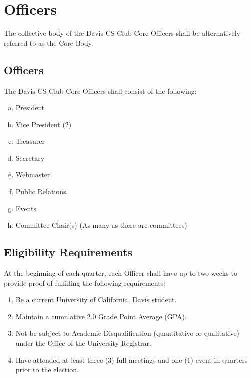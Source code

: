 \documentclass{article}
\newenvironment{li}{
\begin{enumerate}
  \setlength{\itemsep}{1pt}
  \setlength{\parskip}{0pt}
  \setlength{\parsep}{0pt}
}{\end{enumerate}}
\begin{document}
\section{Officers}
The collective body of the Davis CS Club Core Officers shall be alternatively referred to as the Core Body.

\subsection{Officers}
The Davis CS Club Core Officers shall consist of the following:
\begin{enumerate}[a.]
  \setlength{\itemsep}{1pt}
  \setlength{\parskip}{0pt}
  \setlength{\parsep}{0pt}
\item President
\item Vice President (2)
\item Treasurer
\item Secretary
\item Webmaster
\item Public Relations
\item Events
\item Committee Chair(s) (As many as there are committees)
\end{enumerate}

\subsection{Eligibility Requirements}
At the beginning of each quarter, each Officer shall have up to two weeks to provide proof of fulfilling the following requirements:
\begin{li}
\item Be a current University of California, Davis student.
\item Maintain a cumulative 2.0 Grade Point Average (GPA).
\item Not be subject to Academic Disqualification (quantitative or qualitative) under the Office of the University Registrar.
\item Have attended at least three (3) full meetings and one (1) event in quarters prior to the election.
\end{li}
\end{document}
